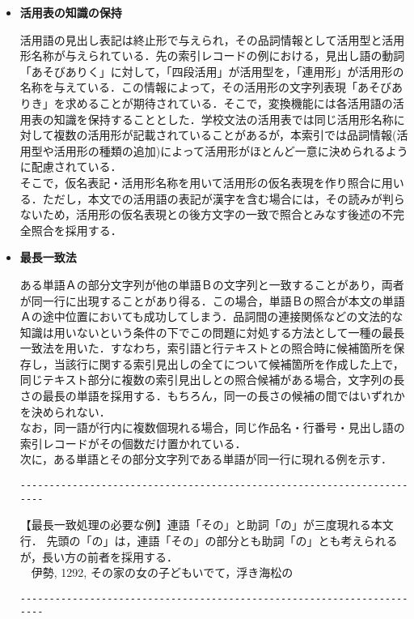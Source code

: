 \begin{itemize}

\item {\bf 活用表の知識の保持}

活用語の見出し表記は終止形で与えられ，その品詞情報として活用型と活用形名称が与えられている．先の索引レコードの例における，見出し語の動詞「あそびありく」に対して，「四段活用」が活用型を，「連用形」が活用形の名称を与えている．この情報によって，その活用形の文字列表現「あそびありき」を求めることが期待されている．そこで，変換機能には各活用語の活用表の知識を保持することとした．学校文法の活用表では同じ活用形名称に対して複数の活用形が記載されていることがあるが，本索引では品詞情報(活用型や活用形の種類の追加)によって活用形がほとんど一意に決められるように配慮されている．
\\
そこで，仮名表記・活用形名称を用いて活用形の仮名表現を作り照合に用いる．ただし，本文での活用語の表記が漢字を含む場合には，その読みが判らないため，活用形の仮名表現との後方文字の一致で照合とみなす後述の不完全照合を採用する．
\item {\bf 最長一致法}

ある単語Ａの部分文字列が他の単語Ｂの文字列と一致することがあり，両者が同一行に出現することがあり得る．この場合，単語Ｂの照合が本文の単語Ａの途中位置においても成功してしまう．品詞間の連接関係などの文法的な知識は用いないという条件の下でこの問題に対処する方法として一種の最長一致法を用いた．すなわち，索引語と行テキストとの照合時に候補箇所を保存し，当該行に関する索引見出しの全てについて候補箇所を作成した上で，同じテキスト部分に複数の索引見出しとの照合候補がある場合，文字列の長さの最長の単語を採用する．もちろん，同一の長さの候補の間ではいずれかを決められない．
\\
なお，同一語が行内に複数個現れる場合，同じ作品名・行番号・見出し語の索引レコードがその個数だけ置かれている．
\\
次に，ある単語とその部分文字列である単語が同一行に現れる例を示す．
\\
\vspace{-14pt}\begin{verbatim}
-----------------------------------------------------------------------
\end{verbatim}

【最長一致処理の必要な例】連語「その」と助詞「の」が三度現れる本文行．
先頭の「の」は，連語「その」の部分とも助詞「の」とも考えられるが，長い方の前者を採用する．
\\
　伊勢, 1292, その家の女の子どもいでて，浮き海松の　　
\begin{verbatim}
-----------------------------------------------------------------------
\end{verbatim}



\end{itemize}
